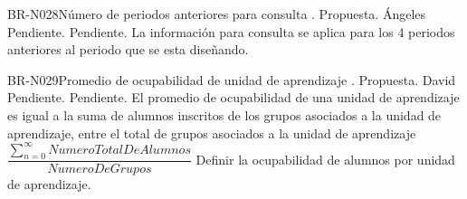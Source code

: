 \begin{BusinessRule}{BR-N028}{Número de periodos anteriores para consulta}
	{\bcCondition}    %
	{\btEnabler}     %
	{\blControlling}    %
	.
	\BRItem[Estado] Propuesta.
	 Ángeles
	 Pendiente.
	 Pendiente.
	\BRItem[Descripción] La información para consulta se aplica para los 4 periodos anteriores al periodo que se esta diseñando.
\end{BusinessRule}

\begin{BusinessRule}{BR-N029}{Promedio de ocupabilidad de unidad de aprendizaje}
	{\bcCondition}    %
	{\btEnabler}     %
	{\blControlling}    %
	.
	\BRItem[Estado] Propuesta.
	 David
	 Pendiente.
	 Pendiente.
	\BRItem[Descripción] El promedio de ocupabilidad de una unidad de aprendizaje es igual a la suma de alumnos inscritos de los grupos asociados a la unidad de aprendizaje, entre el total de grupos asociados a la unidad de aprendizaje
	\BRItem[Sentencia]  $\dfrac{\sum^{\infty}_{n=0}NumeroTotalDeAlumnos}{NumeroDeGrupos}$
	\BRItem[Motivación] Definir la ocupabilidad de alumnos por unidad de aprendizaje.
\end{BusinessRule}

